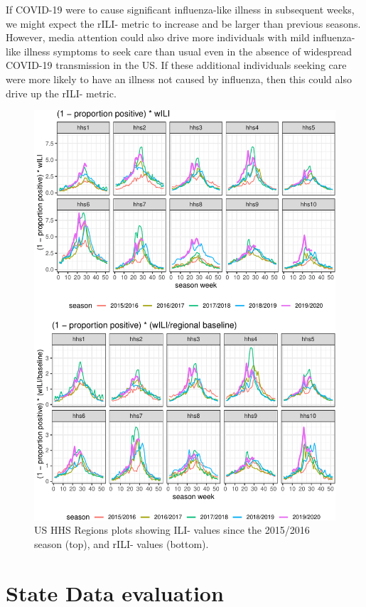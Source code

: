 \documentclass[]{article}
\begin{document}
If COVID-19 were to cause significant influenza-like illness in
subsequent weeks, we might expect the rILI- metric to increase and be
larger than previous seasons. However, media attention could also drive
more individuals with mild influenza-like illness symptoms to seek care
than usual even in the absence of widespread COVID-19 transmission in
the US. If these additional individuals seeking care were more likely to
have an illness not caused by influenza, then this could also drive up
the rILI- metric.

\begin{figure}
\centering
\includegraphics{ili-labtest-report_files/figure-latex/all-region-plot-ILI-1.pdf}
\caption{\label{fig:all-region-plot}US HHS Regions plots showing ILI-
values since the 2015/2016 season (top), and rILI- values (bottom).}
\end{figure}

\hypertarget{state-data-evaluation}{%
\section{State Data evaluation}\label{state-data-evaluation}}
\end{document}
